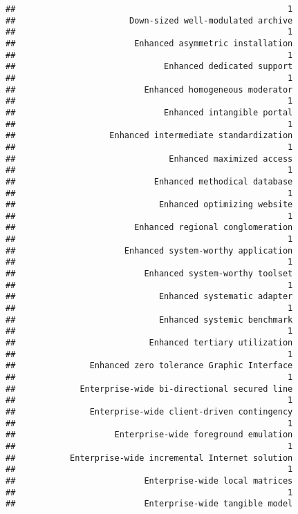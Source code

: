 \documentclass[
]{article}
\begin{document}
\begin{verbatim}
##                                                       1 
##                       Down-sized well-modulated archive 
##                                                       1 
##                        Enhanced asymmetric installation 
##                                                       1 
##                              Enhanced dedicated support 
##                                                       1 
##                          Enhanced homogeneous moderator 
##                                                       1 
##                              Enhanced intangible portal 
##                                                       1 
##                   Enhanced intermediate standardization 
##                                                       1 
##                               Enhanced maximized access 
##                                                       1 
##                            Enhanced methodical database 
##                                                       1 
##                             Enhanced optimizing website 
##                                                       1 
##                        Enhanced regional conglomeration 
##                                                       1 
##                      Enhanced system-worthy application 
##                                                       1 
##                          Enhanced system-worthy toolset 
##                                                       1 
##                             Enhanced systematic adapter 
##                                                       1 
##                             Enhanced systemic benchmark 
##                                                       1 
##                           Enhanced tertiary utilization 
##                                                       1 
##               Enhanced zero tolerance Graphic Interface 
##                                                       1 
##             Enterprise-wide bi-directional secured line 
##                                                       1 
##               Enterprise-wide client-driven contingency 
##                                                       1 
##                    Enterprise-wide foreground emulation 
##                                                       1 
##           Enterprise-wide incremental Internet solution 
##                                                       1 
##                          Enterprise-wide local matrices 
##                                                       1 
##                          Enterprise-wide tangible model 

\end{verbatim}
\end{document}
